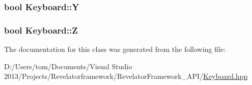 \hypertarget{class_keyboard_a030813b88756995bdc8b577b3674dd0a}{
\subsubsection[{Y}]{\setlength{\rightskip}{0pt plus 5cm}bool Keyboard\-::\-Y\hspace{0.3cm}{\ttfamily [private]}}}\label{class_keyboard_a030813b88756995bdc8b577b3674dd0a}
\hypertarget{class_keyboard_abbae1e2f05e366553c81c136a0f3f970}{
\subsubsection[{Z}]{\setlength{\rightskip}{0pt plus 5cm}bool Keyboard\-::\-Z\hspace{0.3cm}{\ttfamily [private]}}}\label{class_keyboard_abbae1e2f05e366553c81c136a0f3f970}


The documentation for this class was generated from the following file\-:\begin{DoxyCompactItemize}
\item 
D\-:/\-Users/tom/\-Documents/\-Visual Studio 2013/\-Projects/\-Revelatorframework/\-Revelator\-Framework\-\_\-\-A\-P\-I/\hyperlink{_keyboard_8hpp}{Keyboard.\-hpp}\end{DoxyCompactItemize}
